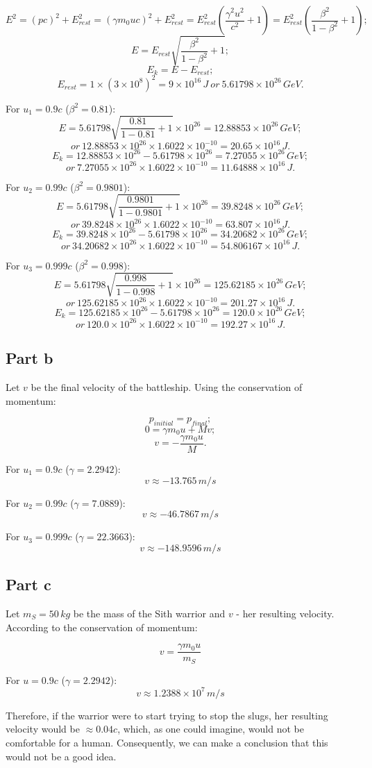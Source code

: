 \documentclass{article}
\begin{document}
\[
E^2 = (pc)^2 + E_{rest}^2 = (\gamma m_0uc)^2 + E_{rest}^2 = E_{rest}^2 (\frac{\gamma ^2 u^2}{c^2} + 1) = E_{rest}^2(\frac{\beta ^2}{1 - \beta ^2} + 1);
\]
\[
E = E_{rest} \sqrt{\frac{\beta ^2}{1 - \beta ^2} + 1};
\]
\[
E_k = E - E_{rest};
\]
\[
E_{rest} = 1 \times (3 \times 10^8)^2 = 9 \times 10^{16}\,J\:or\:5.61798\times10^{26}\,GeV.
\]

For $u_1 = 0.9c$ ($\beta^2 = 0.81$):
\[
E = 5.61798 \sqrt{\frac{0.81}{1-0.81} + 1} \times 10^{26} = 12.88853\times10^{26}\,GeV;
\]
\[
or\:12.88853\times10^{26} \times 1.6022 \times 10^{-10} = 20.65\times10^{16}\,J.
\]
\[
E_k = 12.88853\times10^{26} - 5.61798\times10^{26} = 7.27055\times10^{26}\,GeV;
\]
\[
or\:7.27055\times10^{26} \times 1.6022 \times 10^{-10} = 11.64888\times10^{16}\,J.
\]

For $u_2 = 0.99c$ ($\beta^2 = 0.9801$):
\[
E = 5.61798 \sqrt{\frac{0.9801}{1-0.9801} + 1} \times 10^{26} = 39.8248\times10^{26}\,GeV;
\]
\[
or\:39.8248\times10^{26} \times 1.6022 \times 10^{-10} = 63.807\times10^{16}\,J.
\]
\[
E_k = 39.8248\times10^{26} - 5.61798\times10^{26} = 34.20682\times10^{26}\,GeV;
\]
\[
or\:34.20682\times10^{26} \times 1.6022 \times 10^{-10} = 54.806167\times10^{16}\,J.
\]

For $u_3 = 0.999c$ ($\beta^2 = 0.998$):
\[
E = 5.61798 \sqrt{\frac{0.998}{1-0.998} + 1} \times 10^{26} = 125.62185\times10^{26}\,GeV;
\]
\[
or\:125.62185\times10^{26} \times 1.6022 \times 10^{-10} = 201.27\times10^{16}\,J.
\]
\[
E_k = 125.62185\times10^{26} - 5.61798\times10^{26} = 120.0\times10^{26}\,GeV;
\]
\[
or\:120.0\times10^{26} \times 1.6022 \times 10^{-10} = 192.27\times10^{16}\,J.
\]

\subsection*{Part b}
Let $v$ be the final velocity of the battleship. Using the conservation of momentum:

\[
p_{initial} = p_{final};
\]
\[
0 = \gamma m_0u + Mv;
\]
\[
v = - \frac{\gamma m_0u}{M}.
\]

For $u_1 = 0.9c$ ($\gamma = 2.2942$):
\[
v \approx -13.765\,m/s
\]

For $u_2 = 0.99c$ ($\gamma = 7.0889$):
\[
v \approx -46.7867\,m/s
\]

For $u_3 = 0.999c$ ($\gamma = 22.3663$):
\[
v \approx -148.9596\,m/s
\]

\subsection*{Part c}
Let $m_S = 50\,kg$ be the mass of the Sith warrior and $v$ - her resulting velocity. According to the conservation of momentum:

\[
v = \frac{\gamma m_0u}{m_S}
\]

For $u = 0.9c$ ($\gamma = 2.2942$):
\[
v \approx 1.2388\times10^7 \,m/s
\]

Therefore, if the warrior were to start trying to stop the slugs, her resulting velocity would be $\approx 0.04c$, which, as one could imagine, would not be comfortable for a human. Consequently, we can make a conclusion that this would not be a good idea.
\end{document}
